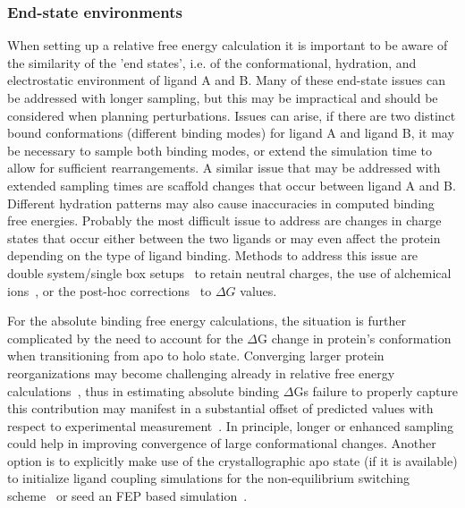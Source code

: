 \documentclass[9pt,bestpractices]{livecoms}
\begin{document}
\subsubsection{End-state environments}
When setting up a relative free energy calculation it is important to be aware of the similarity of the 'end states', i.e. of the conformational, hydration, and electrostatic environment of ligand A and B. Many of these end-state issues can be addressed with longer sampling, but this may be impractical and should be considered when planning perturbations. Issues can arise, if there are two distinct bound conformations (different binding modes) for ligand A and ligand B, it may be necessary to sample both binding modes, or extend the simulation time to allow for sufficient rearrangements. A similar issue that may be addressed with extended sampling times are scaffold changes that occur between ligand A and B. Different hydration patterns may also cause inaccuracies in computed binding free energies. Probably the most difficult issue to address are changes in charge states that occur either between the two ligands or may even affect the protein depending on the type of ligand binding. Methods to address this issue are double system/single box setups~\cite{gapsys2015dssb} to retain neutral charges, the use of alchemical ions~\cite{chen2018chargecorrections}, or the post-hoc corrections~\cite{rocklin2013chargecorrection,reif2014chargecorrections} to $\Delta G$ values.

For the absolute binding free energy calculations, the situation is further complicated by the need to account for the $\Delta$G change in protein's conformation when transitioning from apo to holo state. Converging larger protein reorganizations may become challenging already in relative free energy calculations~\cite{lim2016sensitivity}, thus in estimating absolute binding $\Delta$Gs failure to properly capture this contribution may manifest in a substantial offset of predicted values with respect to experimental measurement~\cite{khalak2021absolutedg}. In principle, longer or enhanced sampling could help in improving convergence of large conformational changes. Another option is to explicitly make use of the crystallographic apo state (if it is available) to initialize ligand coupling simulations for the non-equilibrium switching scheme~\cite{gapsys2021absdg} or seed an FEP based simulation~\cite{hahn2020FEPseeding}.
\end{document}
